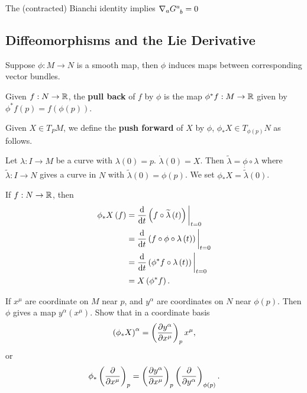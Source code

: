 \begin{exercise}
    The (contracted) Bianchi identity implies $\nabla_a \tensor{G}{^{a}_b} = 0$
\end{exercise}

\subsection{Diffeomorphisms and the Lie Derivative}

Suppose $\phi : M \to N$ is a smooth map, then $\phi$ induces maps between corresponding vector bundles.

\begin{definition}
    Given $f : N \to \mathbb{R}$, the \textbf{pull back} of $f$ by $\phi$ is the map $\phi^{*} f : M \to \mathbb{R}$ given by $\phi^{*} f \left( p \right) = f \left( \phi \left( p \right)  \right) $.
\end{definition}

\begin{definition}
    Given $X \in T_P M$, we define the \textbf{push forward} of $X$ by $\phi$, $\phi_* X \in T_{\phi \left( p \right) }N$ as follows.

    Let $\lambda : I \to M$ be a curve with $\lambda \left( 0 \right) = p$. $\dot{\lambda}\left( 0 \right) = X$. Then $\widetilde{\lambda} = \phi \circ \lambda$ where $\widetilde{\lambda} : I \to N$ gives a curve in $N$ with $\widetilde{\lambda}\left( 0 \right) = \phi \left( p \right) $. We set $\phi_* X = \dot{\widetilde{\lambda}}\left( 0 \right) $.
\end{definition}

\begin{note}
    If $f : N \to \mathbb{R}$, then
    \begin{align}
        \phi_* X \left( f \right) &= \dv{t} \left( f \circ \widetilde{\lambda}\left( t \right)  \right) \bigg|_{t = 0} \\
        &= \dv{t} \left( f \circ \phi \circ \lambda \left( t \right)  \right) \bigg|_{t=0} \\
        &= \dv{t} \left( \phi^{*} f \circ \lambda \left( t \right)  \right) \bigg|_{t=0} \\
        &= X \left( \phi^{*} f \right)
    .\end{align}
\end{note}

\begin{exercise}
    If $x^{\mu}$ are coordinate on $M$ near $p$, and $y^{\alpha}$ are coordinates on $N$ near $\phi\left( p \right) $. Then $\phi$ gives a map $y^{\alpha}\left( x^{\mu} \right) $. Show that in a coordinate basis
    \begin{align}
        \left( \phi_{*} X \right)^{\alpha} = \left( \pdv{y^{\alpha}}{x^{\mu}} \right)_p x^{\mu}
    ,\end{align}
    or
    \begin{align}
        \phi_{*}\left( \pdv{x^{\mu}} \right)_{p} = \left( \pdv{y^{\alpha}}{x^{\mu}} \right)_{p} \left( \pdv{y^{\alpha}} \right)_{\phi \left( p \right) }  
    .\end{align}
\end{exercise}

